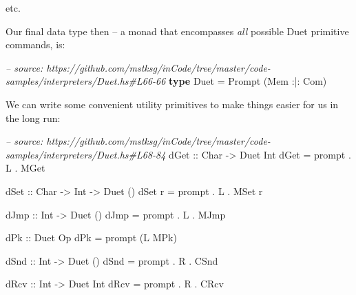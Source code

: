 \documentclass[]{article}
\newenvironment{Shaded}{}{}
\newcommand{\KeywordTok}[1]{\textcolor[rgb]{0.00,0.44,0.13}{\textbf{#1}}}
\newcommand{\DataTypeTok}[1]{\textcolor[rgb]{0.56,0.13,0.00}{#1}}
\newcommand{\CommentTok}[1]{\textcolor[rgb]{0.38,0.63,0.69}{\textit{#1}}}
\newcommand{\OtherTok}[1]{\textcolor[rgb]{0.00,0.44,0.13}{#1}}
\newcommand{\FunctionTok}[1]{\textcolor[rgb]{0.02,0.16,0.49}{#1}}
\newcommand{\NormalTok}[1]{#1}
\begin{document}
etc.

Our final data type then -- a monad that encompasses \emph{all} possible Duet
primitive commands, is:

\begin{Shaded}
\begin{Highlighting}[]
\CommentTok{-- source: https://github.com/mstksg/inCode/tree/master/code-samples/interpreters/Duet.hs#L66-66}
\KeywordTok{type} \DataTypeTok{Duet} \FunctionTok{=} \DataTypeTok{Prompt}\NormalTok{ (}\DataTypeTok{Mem} \FunctionTok{:|:} \DataTypeTok{Com}\NormalTok{)}
\end{Highlighting}
\end{Shaded}

We can write some convenient utility primitives to make things easier for us in
the long run:

\begin{Shaded}
\begin{Highlighting}[]
\CommentTok{-- source: https://github.com/mstksg/inCode/tree/master/code-samples/interpreters/Duet.hs#L68-84}
\OtherTok{dGet ::} \DataTypeTok{Char} \OtherTok{->} \DataTypeTok{Duet} \DataTypeTok{Int}
\NormalTok{dGet }\FunctionTok{=}\NormalTok{ prompt }\FunctionTok{.} \DataTypeTok{L} \FunctionTok{.} \DataTypeTok{MGet}

\OtherTok{dSet ::} \DataTypeTok{Char} \OtherTok{->} \DataTypeTok{Int} \OtherTok{->} \DataTypeTok{Duet}\NormalTok{ ()}
\NormalTok{dSet r }\FunctionTok{=}\NormalTok{ prompt }\FunctionTok{.} \DataTypeTok{L} \FunctionTok{.} \DataTypeTok{MSet}\NormalTok{ r}

\OtherTok{dJmp ::} \DataTypeTok{Int} \OtherTok{->} \DataTypeTok{Duet}\NormalTok{ ()}
\NormalTok{dJmp }\FunctionTok{=}\NormalTok{ prompt }\FunctionTok{.} \DataTypeTok{L} \FunctionTok{.} \DataTypeTok{MJmp}

\OtherTok{dPk ::} \DataTypeTok{Duet} \DataTypeTok{Op}
\NormalTok{dPk }\FunctionTok{=}\NormalTok{ prompt (}\DataTypeTok{L} \DataTypeTok{MPk}\NormalTok{)}

\OtherTok{dSnd ::} \DataTypeTok{Int} \OtherTok{->} \DataTypeTok{Duet}\NormalTok{ ()}
\NormalTok{dSnd }\FunctionTok{=}\NormalTok{ prompt }\FunctionTok{.} \DataTypeTok{R} \FunctionTok{.} \DataTypeTok{CSnd}

\OtherTok{dRcv ::} \DataTypeTok{Int} \OtherTok{->} \DataTypeTok{Duet} \DataTypeTok{Int}
\NormalTok{dRcv }\FunctionTok{=}\NormalTok{ prompt }\FunctionTok{.} \DataTypeTok{R} \FunctionTok{.} \DataTypeTok{CRcv}
\end{Highlighting}
\end{Shaded}
\end{document}
